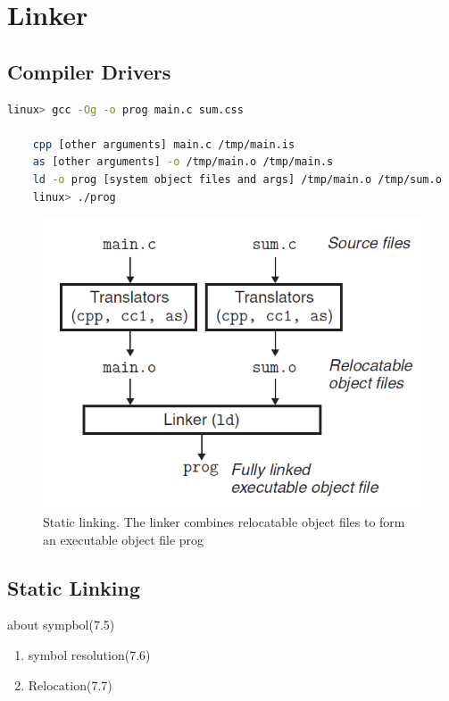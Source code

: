 \chapter{Linker}

\section{Compiler Drivers}



\begin{lstlisting}[language=bash]
    linux> gcc -Og -o prog main.c sum.css

    cpp [other arguments] main.c /tmp/main.is
    as [other arguments] -o /tmp/main.o /tmp/main.s
    ld -o prog [system object files and args] /tmp/main.o /tmp/sum.o
    linux> ./prog
\end{lstlisting}

\begin{figure}[h!]
    \centering
    \includegraphics[scale=0.5]{pic/section7/pic1.png}
    \caption{Static linking. The linker combines relocatable    object files to form an executable object file prog}
\end{figure}



\section{Static Linking}

about sympbol(7.5)
\begin{enumerate}
    \item symbol resolution(7.6)
    \item Relocation(7.7)
\end{enumerate}

